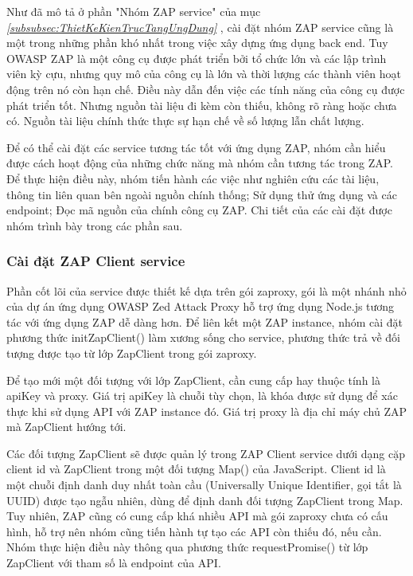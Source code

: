 \tab Như đã mô tả ở phần "Nhóm ZAP service" của mục \textit{\ref{subsubsec:ThietKeKienTrucTangUngDung} }, cài đặt nhóm ZAP service cũng là một trong những phần khó nhất trong việc xây dựng ứng dụng back end.
Tuy OWASP ZAP là một công cụ được phát triển bởi tổ chức lớn và các lập trình viên kỳ cựu, nhưng quy mô của công cụ là lớn và thời lượng các thành viên hoạt động trên nó còn hạn chế.
Điều này dẫn đến việc các tính năng của công cụ được phát triển tốt.
Nhưng nguồn tài liệu đi kèm còn thiếu, không rõ ràng hoặc chưa có.
Nguồn tài liệu chính thức thực sự hạn chế về số lượng lẫn chất lượng.

Để có thể cài đặt các service tương tác tốt với ứng dụng ZAP,
nhóm cần hiểu được cách hoạt động của những chức năng mà nhóm cần tương tác trong ZAP.
Để thực hiện điều này, nhóm tiến hành các việc như nghiên cứu các tài liệu, thông tin liên quan bên ngoài nguồn chính thống;
Sử dụng thử ứng dụng và các endpoint; Đọc mã nguồn của chính công cụ ZAP.
Chi tiết của các cài đặt được nhóm trình bày trong các phần sau.

\subsubsection{Cài đặt ZAP Client service} \label{subsubsec:CaiDatZapClientService}

\tab Phần cốt lõi của service được thiết kế dựa trên gói zaproxy, gói là một nhánh nhỏ của dự án ứng dụng OWASP Zed Attack Proxy hỗ trợ ứng dụng Node.js tương tác với ứng dụng ZAP dễ dàng hơn. Để liên kết một ZAP instance, nhóm cài đặt phương thức initZapClient() làm xương sống cho service, phương thức trả về đối tượng được tạo từ lớp ZapClient trong gói zaproxy.

Để tạo mới một đối tượng với lớp ZapClient, cần cung cấp hay thuộc tính là apiKey và proxy. Giá trị apiKey là chuỗi tùy chọn, là khóa được sử dụng để xác thực khi sử dụng API với ZAP instance đó. Giá trị proxy là địa chỉ máy chủ ZAP mà ZapClient hướng tới.

Các đối tượng ZapClient sẽ được quản lý trong ZAP Client service dưới dạng cặp client id và ZapClient trong một đối tượng Map() của JavaScript. Client id là một chuỗi định danh duy nhất toàn cầu (Universally Unique Identifier, gọi tắt là UUID) được tạo ngẫu nhiên, dùng để định danh đối tượng ZapClient trong Map. Tuy nhiên, ZAP cũng có cung cấp khá nhiều API mà gói zaproxy chưa có cấu hình, hỗ trợ nên nhóm cũng tiến hành tự tạo các API còn thiếu đó, nếu cần. Nhóm thực hiện điều này thông qua phương thức requestPromise() từ lớp ZapClient với tham số là endpoint của API.

